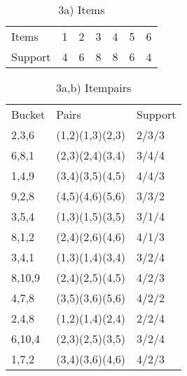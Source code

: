 \documentclass[11pt,a4paper]{scrartcl}
\begin{document}
\begin{itemize}

\begin{table}[h]
\centering
\caption{3a) Items}
\label{my-label}
\begin{tabular}{lllllll}
Items & 1 & 2 & 3 & 4 & 5 & 6 \\
Support & 4 & 6 & 8 & 8 & 6 & 4
\end{tabular}
\end{table}

\begin{table}[h]
\centering
\caption{3a,b) Itempairs}
\label{my-label}
\begin{tabular}{lll}
Bucket & Pairs           & Support \\
2,3,6   & (1,2)(1,3)(2,3) & 2/3/3   \\
6,8,1   & (2,3)(2,4)(3,4) & 3/4/4   \\
1,4,9   & (3,4)(3,5)(4,5) & 4/4/3   \\
9,2,8   & (4,5)(4,6)(5,6) & 3/3/2   \\
3,5,4   & (1,3)(1,5)(3,5) & 3/1/4   \\
8,1,2   & (2,4)(2,6)(4,6) & 4/1/3   \\
3,4,1   & (1,3)(1,4)(3,4) & 3/2/4   \\
8,10,9   & (2,4)(2,5)(4,5) & 4/2/3   \\
4,7,8   & (3,5)(3,6)(5,6) & 4/2/2   \\
2,4,8   & (1,2)(1,4)(2,4) & 2/2/4   \\
6,10,4   & (2,3)(2,5)(3,5) & 3/2/4   \\
1,7,2   & (3,4)(3,6)(4,6) & 4/2/3  
\end{tabular}
\end{table}
	

\end{itemize}
\end{document}
